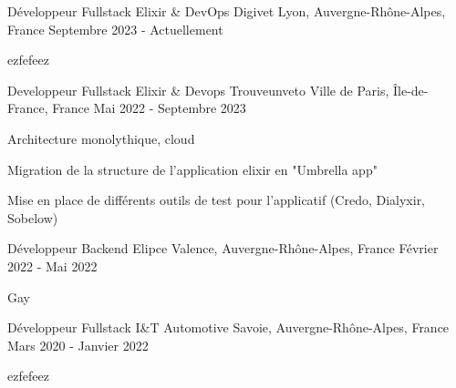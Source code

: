 
\begin{cventries}
  \cventry
    {Développeur Fullstack Elixir \& DevOps}
    {Digivet}
    {Lyon, Auvergne-Rhône-Alpes, France}
    {Septembre 2023 - Actuellement}
    {
      \begin{cvitems}
        \item {ezfefeez}
      \end{cvitems}
    }

  \cventry
    {Developpeur Fullstack Elixir \& Devops}
    {Trouveunveto}
    {Ville de Paris, Île-de-France, France}
    {Mai 2022 - Septembre 2023}
    {
      \begin{cvitems}
        \item {Architecture monolythique, cloud}
        \item {Migration de la structure de l'application elixir en "Umbrella app"}
        \item {Mise en place de différents outils de test pour l'applicatif (Credo, Dialyxir, Sobelow)}
      \end{cvitems}
    }

  \cventry
    {Développeur Backend}
    {Elipce}
    {Valence, Auvergne-Rhône-Alpes, France}
    {Février 2022 - Mai 2022}
    {
      \begin{cvitems}
        \item {Gay}
      \end{cvitems}
    }

  \cventry
    {Développeur Fullstack}
    {I\&T Automotive}
    {Savoie, Auvergne-Rhône-Alpes, France}
    {Mars 2020 - Janvier 2022}
    {
      \begin{cvitems}
        \item{ezfefeez}
      \end{cvitems}
    }
\end{cventries}
